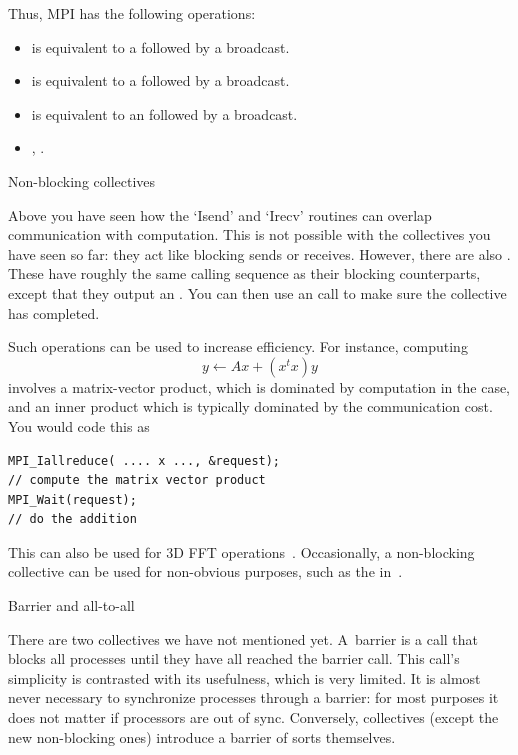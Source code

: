 Thus, MPI has the following operations:
\begin{itemize}
\item {} is equivalent to a  followed by a broadcast.
\item {} is equivalent to a  followed by a broadcast.
\item {} is equivalent to an  followed by a broadcast.
\item {}, .
\end{itemize}

 {Non-blocking collectives}

Above you have seen how the `Isend' and `Irecv' routines can overlap communication
with computation. This is not possible with the collectives you have seen so far:
they act like blocking sends or receives.
However, there are also .
These have roughly the same calling sequence as their blocking counterparts,
except that they output an . You
can then use an  call to make sure the collective
has completed.

Such operations can be used to increase efficiency.
For instance, computing
\[ y \leftarrow Ax + (x^tx)y \]
involves a matrix-vector product, which is dominated by computation
in the  case, and an inner product which is 
typically dominated by the communication cost. You would code this as
\begin{verbatim}
MPI_Iallreduce( .... x ..., &request);
// compute the matrix vector product
MPI_Wait(request);
// do the addition
\end{verbatim}

This can also be used for 3D FFT operations~\cite{Hoefler:case-for-nbc}.
Occasionally, a non-blocking collective can be used for non-obvious purposes,
such as the  in~\cite{Hoefler:2010:SCP}.

 {Barrier and all-to-all}

There are two collectives we have not mentioned yet. A~barrier is a
call that blocks all processes until they have all reached the barrier
call. This call's simplicity is contrasted with its usefulness, which
is very limited. It is almost never necessary to synchronize processes
through a barrier: for most purposes it does not matter if processors
are out of sync. Conversely, collectives (except the new non-blocking
ones) introduce a barrier of sorts themselves.

